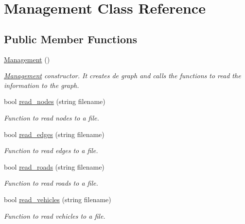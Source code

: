 \hypertarget{class_management}{}\section{Management Class Reference}
\label{class_management}
\subsection*{Public Member Functions}
\begin{DoxyCompactItemize}
\item 
\mbox{\label{class_management_af6443089434984f915086ab2526b570b}} 
\mbox{\hyperlink{class_management_af6443089434984f915086ab2526b570b}{Management}} ()
\begin{DoxyCompactList}\small\item\em \mbox{\hyperlink{class_management}{Management}} constructor. It creates de graph and calls the functions to read the information to the graph. \end{DoxyCompactList}\item 
bool \mbox{\hyperlink{class_management_abd2b54f0edd1686ee127cff8816a2a2e}{read\+\_\+nodes}} (string filename)
\begin{DoxyCompactList}\small\item\em Function to read nodes to a file. \end{DoxyCompactList}\item 
bool \mbox{\hyperlink{class_management_a06aef0ba82fa962d986eb9de55b8816b}{read\+\_\+edges}} (string filename)
\begin{DoxyCompactList}\small\item\em Function to read edges to a file. \end{DoxyCompactList}\item 
bool \mbox{\hyperlink{class_management_a67738d2358c0b97686e4fc47356d8b78}{read\+\_\+roads}} (string filename)
\begin{DoxyCompactList}\small\item\em Function to read roads to a file. \end{DoxyCompactList}\item 
bool \mbox{\hyperlink{class_management_af37e787a2e40e21afc0a6f7ca2742cd3}{read\+\_\+vehicles}} (string filename)
\begin{DoxyCompactList}\small\item\em Function to read vehicles to a file. \end{DoxyCompactList}\item 

\end{DoxyCompactItemize}

